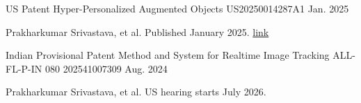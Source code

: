

\begin{cventries}

  \cventry
    {US Patent} %
    {Hyper-Personalized Augmented Objects} %
    {US20250014287A1} %
    {Jan. 2025} %
    {
      \begin{cvitems} %
        \item {Prakharkumar Srivastava, et al. Published January 2025. \href{https://patents.google.com/patent/US20250014287A1/en?oq=US20250014287A1}{link}}
      \end{cvitems}
    }

  \cventry
    {Indian Provisional Patent} %
    {Method and System for Realtime Image Tracking} %
    {ALL-FL-P-IN 080 202541007309} %
    {Aug. 2024} %
    {
      \begin{cvitems} %
        \item {Prakharkumar Srivastava, et al. US hearing starts July 2026.}
      \end{cvitems}
    }

\end{cventries}
